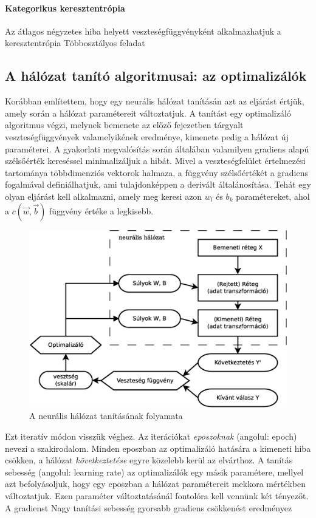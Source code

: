 \paragraph{Kategorikus keresztentrópia}
Az átlagos négyzetes hiba helyett veszteségfüggvényként alkalmazhatjuk a keresztentrópia Többosztályos feladat

\subsection{A hálózat tanító algoritmusai: az optimalizálók}
Korábban említettem, hogy egy neurális hálózat tanításán azt az eljárást értjük, amely során a hálózat paramétereit változtatjuk. A tanítást egy optimalizáló algoritmus végzi, melynek bemenete az előző fejezetben tárgyalt veszteségfüggvények valamelyikének eredménye, kimenete pedig a hálózat új paraméterei. A gyakorlati megvalósítás során általában valamilyen gradiens alapú szélsőérték kereséssel minimalizáljuk a hibát. Mivel a veszteségfelület értelmezési tartománya többdimenziós vektorok halmaza, a függvény szélsőértékét a gradiens fogalmával definiálhatjuk, ami tulajdonképpen a derivált általánosítása. Tehát egy olyan eljárást kell alkalmazni, amely meg keresi azon $w_l$ és $b_k$ paramétereket, ahol a $c(\vec{w},\vec{b})$ függvény értéke a legkisebb.
\begin{figure}[h]
	\centering
	\includegraphics[width=0.7\linewidth]{fig/DNN_dia}
	\caption{A neurális hálózat tanításának folyamata}
	\label{fig:dnn}
\end{figure}

Ezt iteratív módon visszük véghez. Az iterációkat \emph{eposzoknak} (angolul: epoch) nevezi a szakirodalom. Minden eposzban az optimalizáló hatására a kimeneti hiba csökken, a hálózat \emph{következtetése} egyre közelebb kerül az elvárthoz. A tanítás sebesség (angolul: learning rate) az optimalizálók egy másik paramétere, mellyel azt befolyásoljuk, hogy egy eposzban a hálózat paramétereit mekkora mértékben változtatjuk. Ezen paraméter változtatásánál fontolóra kell vennünk két tényezőt.
A gradienst
Nagy tanítási sebesség gyorsabb gradiens csökkenést eredményez

